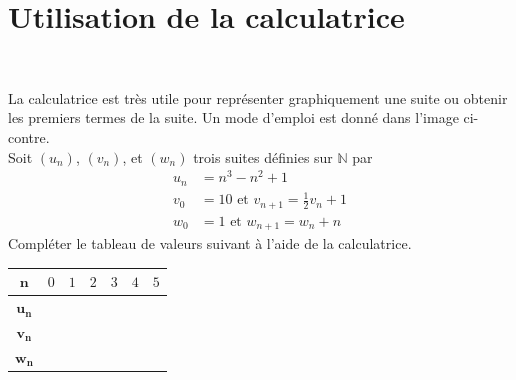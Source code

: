 \documentclass[11pt]{article}
\begin{document}
\section{Utilisation de la calculatrice}~\\[-10mm]
\begin{minipage}{.48\textwidth}
  La calculatrice est très utile pour représenter graphiquement une suite ou
  obtenir les premiers termes de la suite. Un mode d'emploi est donné dans
  l'image ci-contre.\\[10mm]
   Soit $(u_n)$, $(v_n)$, et $(w_n)$ trois suites définies sur $\mathbb{N}$ par
   \begin{align*}
     u_n &= n^3-n^2+1 \\
     v_0 &=10\text{ et }v_{n+1}=\frac{1}{2}v_n+1 \\
     w_0 &=1\text{ et }w_{n+1} = w_n+n
   \end{align*}
  Compléter le tableau de valeurs suivant à l'aide de la calculatrice.
  \begin{center}
  \renewcommand{\arraystretch}{2}
  \begin{tabularx}{\textwidth}{|c|Y|Y|Y|Y|Y|Y|}
   \hline
   $\mathbf{n}$ & $0$ & $1$ & $2$ & $3$ & $4$ & $5$ \\
   \hline
   $\mathbf{u_n}$ & & & & & & \\
   \hline
   $\mathbf{v_n}$ & & & & & & \\
   \hline
   $\mathbf{w_n}$ & & & & & & \\
   \hline
  \end{tabularx}
  \end{center}
\end{minipage}
\hfill
\end{document}
